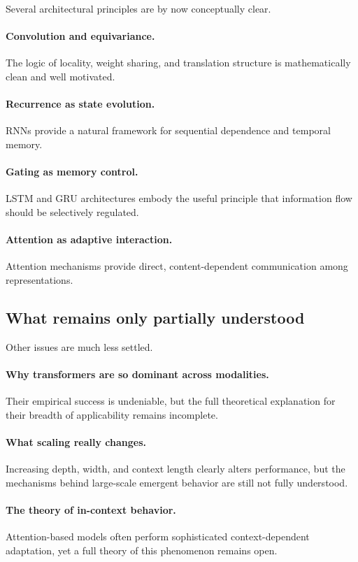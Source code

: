 Several architectural principles are by now conceptually clear.

\paragraph{Convolution and equivariance.}
The logic of locality, weight sharing, and translation structure is mathematically clean and well motivated.

\paragraph{Recurrence as state evolution.}
RNNs provide a natural framework for sequential dependence and temporal memory.

\paragraph{Gating as memory control.}
LSTM and GRU architectures embody the useful principle that information flow should be selectively regulated.

\paragraph{Attention as adaptive interaction.}
Attention mechanisms provide direct, content-dependent communication among representations.

\subsection*{What remains only partially understood}

Other issues are much less settled.

\paragraph{Why transformers are so dominant across modalities.}
Their empirical success is undeniable, but the full theoretical explanation for their breadth of applicability remains incomplete.

\paragraph{What scaling really changes.}
Increasing depth, width, and context length clearly alters performance, but the mechanisms behind large-scale emergent behavior are still not fully understood.

\paragraph{The theory of in-context behavior.}
Attention-based models often perform sophisticated context-dependent adaptation, yet a full theory of this phenomenon remains open.

